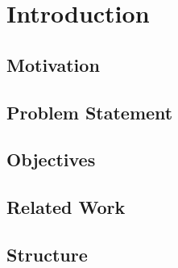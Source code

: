 
\chapter{Introduction}
\label{cha:introduction}

\section{Motivation}
\label{sec:motivation}


\section{Problem Statement}
\label{sec:problem-statement}


\section{Objectives}
\label{sec:objectives}


\section{Related Work}
\label{sec:related-work}


\section{Structure}
\label{sec:structure}